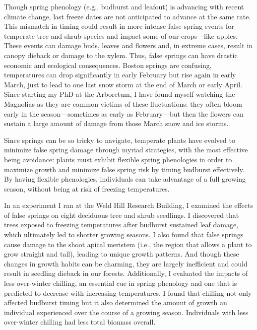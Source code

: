 \documentclass{article}\usepackage[]{graphicx}\usepackage[]{color}
\begin{document}
Though spring phenology (e.g., budburst and leafout) is advancing with recent climate change, last freeze dates are not anticipated to advance at the same rate. This mismatch in timing could result in more intense false spring events for temperate tree and shrub species and impact some of our crops---like apples. These events can damage buds, leaves and flowers and, in extreme cases, result in canopy dieback or damage to the xylem. Thus, false springs can have drastic economic and ecological consequences. Boston springs are confusing, temperatures can drop significantly in early February but rise again in early March, just to lead to one last snow storm at the end of March or early April. Since starting my PhD at the Arboretum, I have found myself watching the Magnolias as they are common victims of these fluctuations: they often bloom early in the season---sometimes as early as February---but then the flowers can sustain a large amount of damage from those March snow and ice storms. 

Since springs can be so tricky to navigate, temperate plants have evolved to minimize false spring damage through myriad strategies, with the most effective being avoidance: plants must exhibit flexible spring phenologies in order to maximize growth and minimize false spring risk by timing budburst effectively. By having flexible phenologies, individuals can take advantage of a full growing season, without being at risk of freezing temperatures.

In an experiment I ran at the Weld Hill Research Building, I examined the effects of false springs on eight deciduous tree and shrub seedlings. I discovered that trees exposed to freezing temperatures after budburst sustained leaf damage, which ultimately led to shorter growing seasons. I also found that false springs cause damage to the shoot apical meristem (i.e., the region that allows a plant to grow straight and tall), leading to unique growth patterns. And though these changes in growth habits can be charming, they are largely inefficient and could result in seedling dieback in our forests. Additionally, I evaluated the impacts of less over-winter chilling, an essential cue in spring phenology and one that is predicted to decrease with increasing temperatures. I found that chilling not only affected budburst timing but it also determined the amount of growth an individual experienced over the course of a growing season. Individuals with less over-winter chilling had less total biomass overall. 
\end{document}
